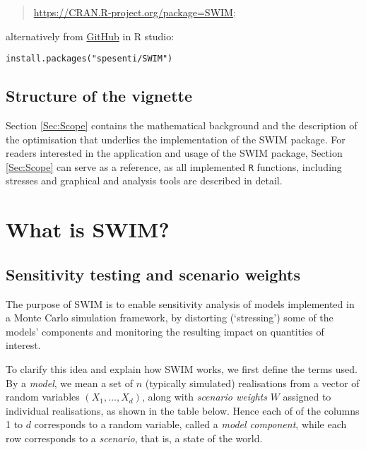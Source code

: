 \documentclass[]{article}
\begin{document}
\begin{quote}
\url{https://CRAN.R-project.org/package=SWIM};
\end{quote}

alternatively from \href{https://github.com/spesenti/SWIM}{GitHub} in R studio:

\begin{verbatim}
install.packages("spesenti/SWIM")
\end{verbatim}

\hypertarget{structure-of-the-vignette}{%
\subsection{Structure of the vignette}\label{structure-of-the-vignette}}

Section \ref{Sec:Scope} contains the mathematical background and the description of the optimisation that underlies the implementation of the SWIM package. For readers interested in the application and usage of the SWIM package, Section \ref{Sec:Scope} can serve as a reference, as all implemented \texttt{R} functions, including stresses and graphical and analysis tools are described in detail.

\hypertarget{what-is-swim}{%
\section{What is SWIM?}\label{what-is-swim}}

\hypertarget{sensitivity-testing-and-scenario-weights}{%
\subsection{Sensitivity testing and scenario weights}\label{sensitivity-testing-and-scenario-weights}}

The purpose of SWIM is to enable sensitivity analysis of models implemented in a Monte Carlo simulation framework, by distorting (`stressing') some of the models' components and monitoring the resulting impact on quantities of interest.

To clarify this idea and explain how SWIM works, we first define the terms used. By a \emph{model}, we mean a set of \(n\) (typically simulated) realisations from a vector of random variables \((X_1,\dots,X_d)\), along with \emph{scenario weights} \(W\) assigned to individual realisations, as shown in the table below. Hence each of of the columns 1 to \(d\) corresponds to a random variable, called a \emph{model component}, while each row corresponds to a \emph{scenario}, that is, a state of the world.
\end{document}
